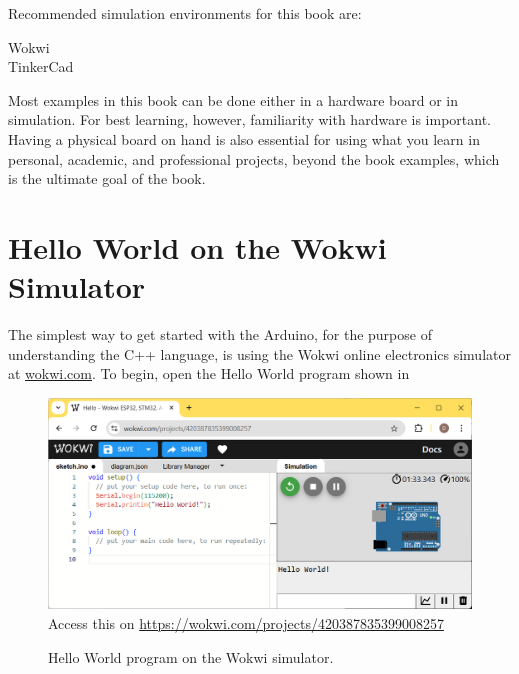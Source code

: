 Recommended simulation environments for this book are:
\begin{description}
\item[Wokwi] 
\item[TinkerCad] 
\end{description}

Most examples in this book can be done either in a hardware board or in simulation.
For best learning, however, familiarity with hardware is important.
Having a physical board on hand is also essential for using what you learn in personal, academic, and professional projects, beyond the book examples, which is the ultimate goal of the book.

\section{Hello World on the Wokwi Simulator}
The simplest way to get started with the Arduino, for the purpose of understanding the C++ language, is using the Wokwi online electronics simulator at \href{https://wokwi.com}{wokwi.com}.
To begin, open the Hello World program shown in 

\begin{figure}
  \begin{wide}
    \includegraphics[width=\textwidth]{img/wokwi-hello.png}
    \\ \scriptsize
    Access this on \url{https://wokwi.com/projects/420387835399008257}
    \caption{Hello World program on the Wokwi simulator.}
    \label{fig:wokwi-hello}    
  \end{wide}
\end{figure}

